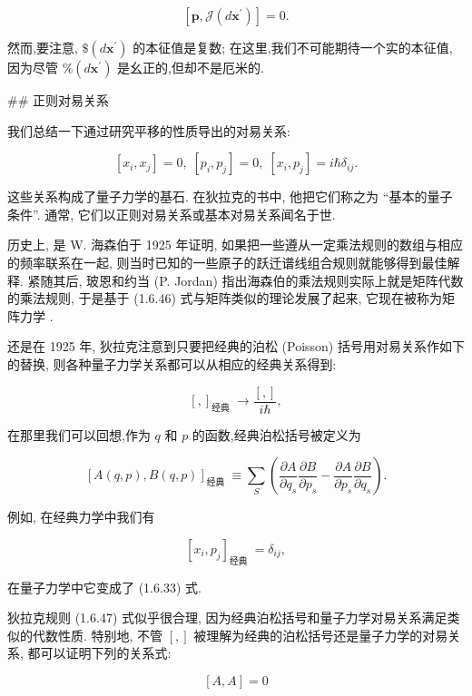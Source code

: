 \documentclass[lang=cn,newtx,10pt,scheme=chinese,thmcnt=section]{elegantbook}
\begin{document}
$$
\left\lbrack {\mathbf{p},\mathcal{J}\left( {d{\mathbf{x}}^{\prime }}\right) }\right\rbrack = 0. \tag{1.6.45}
$$

然而,要注意, $\$ \left( {d{\mathbf{x}}^{\prime }}\right)$ 的本征值是复数; 在这里,我们不可能期待一个实的本征值,因为尽管 $\% \left( {d{\mathbf{x}}^{\prime }}\right)$ 是幺正的,但却不是厄米的.

## 正则对易关系

我们总结一下通过研究平移的性质导出的对易关系:

$$
\left\lbrack {{x}_{i},{x}_{j}}\right\rbrack = 0,\;\left\lbrack {{p}_{i},{p}_{j}}\right\rbrack = 0,\;\left\lbrack {{x}_{i},{p}_{j}}\right\rbrack = i\hbar {\delta }_{ij}. \tag{1.6.46}
$$

这些关系构成了量子力学的基石. 在狄拉克的书中, 他把它们称之为 “基本的量子条件”. 通常, 它们以正则对易关系或基本对易关系闻名于世.

历史上, 是 W. 海森伯于 1925 年证明, 如果把一些遵从一定乘法规则的数组与相应的频率联系在一起, 则当时已知的一些原子的跃迁谱线组合规则就能够得到最佳解释. 紧随其后, 玻恩和约当 (P. Jordan) 指出海森伯的乘法规则实际上就是矩阵代数的乘法规则, 于是基于 (1.6.46) 式与矩阵类似的理论发展了起来, 它现在被称为矩阵力学 .

还是在 1925 年, 狄拉克注意到只要把经典的泊松 (Poisson) 括号用对易关系作如下的替换, 则各种量子力学关系都可以从相应的经典关系得到:

$$
{\left\lbrack ,\right\rbrack }_{\text{经典 }} \rightarrow \frac{\left\lbrack ,\right\rbrack }{i\hbar }, \tag{1.6.47}
$$

在那里我们可以回想,作为 $q$ 和 $p$ 的函数,经典泊松括号被定义为

$$
{\left\lbrack A\left( q, p\right), B\left( q, p\right) \right\rbrack }_{\text{经典 }} \equiv \mathop{\sum }\limits_{S}\left( {\frac{\partial A}{\partial {q}_{s}}\frac{\partial B}{\partial {p}_{s}} - \frac{\partial A}{\partial {p}_{s}}\frac{\partial B}{\partial {q}_{s}}}\right) . \tag{1.6.48}
$$

例如, 在经典力学中我们有

$$
{\left\lbrack {x}_{i},{p}_{j}\right\rbrack }_{\text{经典 }} = {\delta }_{ij}, \tag{1.6.49}
$$

在量子力学中它变成了 (1.6.33) 式.

狄拉克规则 (1.6.47) 式似乎很合理, 因为经典泊松括号和量子力学对易关系满足类似的代数性质. 特别地, 不管 $\left\lbrack ,\right\rbrack$ 被理解为经典的泊松括号还是量子力学的对易关系, 都可以证明下列的关系式:

$$
\left\lbrack {A, A}\right\rbrack = 0 \tag{1.6.50a}
$$
\end{document}
